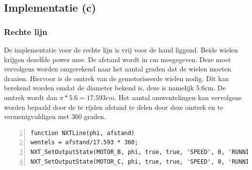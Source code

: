 \documentclass[a4paper]{article}
\begin{document}
\subsection{Implementatie (c)}
\subsubsection{Rechte lijn}
De implementatie voor de rechte lijn is vrij voor de hand liggend. Beide wielen krijgen dezelfde power mee. De afstand wordt in cm meegegeven. Deze moet vervolgens worden omgerekend naar het aantal graden dat de wielen moeten draaien. Hiervoor is de omtrek van de gemotoriseerde wielen nodig. Dit kan berekend worden omdat de diameter bekend is, deze is namelijk 5.6cm. De omtrek wordt dan $\pi * 5.6 = 17.593cm$. Het aantal omwentelingen kan vervolgens worden bepaald door de te rijden afstand te delen door deze omtrek en te vermenigvuldigen met 360 graden.
\begin{lstlisting}[caption=Rechte lijn, label=lst:line, numbers=left]
function NXTLine(phi, afstand)
wentels = afstand/17.593 * 360;
NXT_SetOutputState(MOTOR_B, phi, true, true, 'SPEED', 0, 'RUNNING', wentels, 'dontreply');
NXT_SetOutputState(MOTOR_C, phi, true, true, 'SPEED', 0, 'RUNNING', wentels, 'dontreply');
\end{lstlisting}
\end{document}
